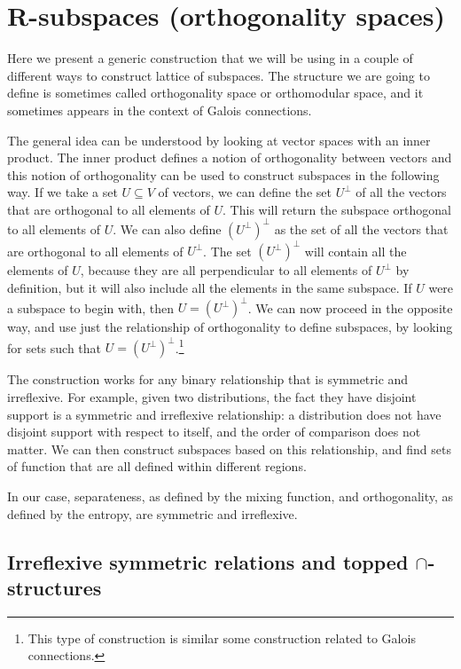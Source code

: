 \section{R-subspaces (orthogonality spaces)}\label{pm_es_subspaceSection}

Here we present a generic construction that we will be using in a couple of different ways to construct lattice of subspaces. The structure we are going to define is sometimes called orthogonality space or orthomodular space, and it sometimes appears in the context of Galois connections.

The general idea can be understood by looking at vector spaces with an inner product. The inner product defines a notion of orthogonality between vectors and this notion of orthogonality can be used to construct subspaces in the following way. If we take a set $U \subseteq V$ of vectors, we can define the set $U^{\perp}$ of all the vectors that are orthogonal to all elements of $U$. This will return the subspace orthogonal to all elements of $U$. We can also define $(U^{\perp})^{\perp}$ as the set of all the vectors that are orthogonal to all elements of $U^{\perp}$. The set $(U^{\perp})^{\perp}$ will contain all the elements of $U$, because they are all perpendicular to all elements of $U^{\perp}$ by definition, but it will also include all the elements in the same subspace. If $U$ were a subspace to begin with, then $U = (U^{\perp})^{\perp}$. We can now proceed in the opposite way, and use just the relationship of orthogonality to define subspaces, by looking for sets such that $U = (U^{\perp})^{\perp}$.\footnote{This type of construction is similar some construction related to Galois connections.}

The construction works for any binary relationship that is symmetric and irreflexive. For example, given two distributions, the fact they have disjoint support is a symmetric and irreflexive relationship: a distribution does not have disjoint support with respect to itself, and the order of comparison does not matter. We can then construct subspaces based on this relationship, and find sets of function that are all defined within different regions.

In our case, separateness, as defined by the mixing function, and orthogonality, as defined by the entropy, are symmetric and irreflexive.

\subsection{Irreflexive symmetric relations and topped $\cap$-structures}

